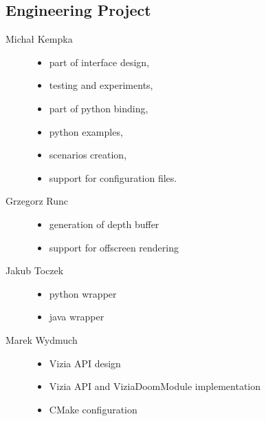 	\subsection{Engineering Project}
	\begin{description}
		\item[Michał Kempka] \hfill
			\begin{itemize}
				\item part of interface design,
				\item testing and experiments,
				\item part of python binding,
				\item python examples,
				\item scenarios creation,
				\item support for configuration files.
			\end{itemize}
		\item[Grzegorz Runc] \hfill
			\begin{itemize}
				\item generation of depth buffer
				\item support for offscreen rendering
			\end{itemize}
		\item[Jakub Toczek] \hfill
			\begin{itemize}
				\item python wrapper
				\item java wrapper
			\end{itemize}
		\item[Marek Wydmuch] \hfill
			\begin{itemize}
				\item Vizia API design
				\item Vizia API and ViziaDoomModule implementation
				\item CMake configuration
			\end{itemize}
	\end{description}
	
   	
